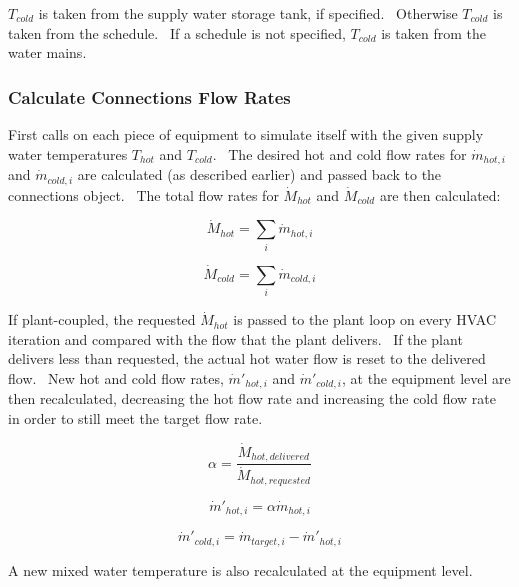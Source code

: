\({T_{cold}}\) is taken from the supply water storage tank, if specified.~ Otherwise \({T_{cold}}\) is taken from the schedule.~ If a schedule is not specified, \({T_{cold}}\) is taken from the water mains.

\subsubsection{Calculate Connections Flow Rates}\label{calculate-connections-flow-rates}

First calls on each piece of equipment to simulate itself with the given supply water temperatures \({T_{hot}}\) and \({T_{cold}}\).~ The desired hot and cold flow rates for \({\dot m_{hot,i}}\) and \({\dot m_{cold,i}}\) are calculated (as described earlier) and passed back to the connections object.~ The total flow rates for \({\dot M_{hot}}\) and \({\dot M_{cold}}\) are then calculated:

\begin{equation}
{\dot M_{hot}} = \mathop \sum \limits_i {\dot m_{hot,i}}
\end{equation}

\begin{equation}
{\dot M_{cold}} = \mathop \sum \limits_i {\dot m_{cold,i}}
\end{equation}

If plant-coupled, the requested \({\dot M_{hot}}\) is passed to the plant loop on every HVAC iteration and compared with the flow that the plant delivers.~ If the plant delivers less than requested, the actual hot water flow is reset to the delivered flow.~ New hot and cold flow rates, \({\dot m'_{hot,i}}\) and \({\dot m'_{cold,i}}\), at the equipment level are then recalculated, decreasing the hot flow rate and increasing the cold flow rate in order to still meet the target flow rate.

\begin{equation}
\alpha  = \frac{{\dot M}_{hot,delivered}}{{\dot M}_{hot,requested}}
\end{equation}

\begin{equation}
{\dot m'_{hot,i}} = \alpha {\dot m_{hot,i}}
\end{equation}

\begin{equation}
{\dot m'_{cold,i}} = {\dot m_{target,i}} - {\dot m'_{hot,i}}
\end{equation}

A new mixed water temperature is also recalculated at the equipment level.


